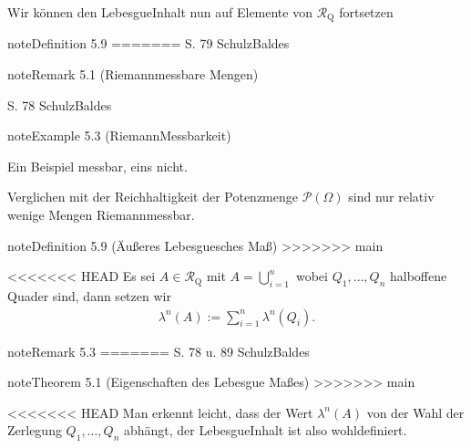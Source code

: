 \documentclass[letterpaper,10pt,english]{jupyterBook}
\begin{document}
\sphinxAtStartPar
Wir können den Lebesgue\sphinxhyphen{}Inhalt nun auf Elemente von \(\mathcal{R}_{\text{Q}}\) fortsetzen
\label{masstheorie/masstheorie:definition-15}
\begin{sphinxadmonition}{note}{Definition 5.9}
=======
S. 79 Schulz\sphinxhyphen{}Baldes
\end{sphinxadmonition}
\label{masstheorie/masstheorie:remark-10}
\begin{sphinxadmonition}{note}{Remark 5.1 (Riemann\sphinxhyphen{}messbare Mengen)}



\sphinxAtStartPar
S. 78 Schulz\sphinxhyphen{}Baldes
\end{sphinxadmonition}
\label{masstheorie/masstheorie:example-11}
\begin{sphinxadmonition}{note}{Example 5.3 (Riemann\sphinxhyphen{}Messbarkeit)}



\sphinxAtStartPar
Ein Beispiel messbar, eins nicht.
\end{sphinxadmonition}

\sphinxAtStartPar
Verglichen mit der Reichhaltigkeit der Potenzmenge \(\mathcal{P}(\Omega)\) sind nur relativ wenige Mengen Riemann\sphinxhyphen{}messbar.
\label{masstheorie/masstheorie:definition-12}
\begin{sphinxadmonition}{note}{Definition 5.9 (Äußeres Lebesguesches Maß)}
>>>>>>> main



\sphinxAtStartPar
<<<<<<< HEAD
Es sei \(A\in\mathcal{R}_{\text{Q}}\) mit \(A=\bigcup_{i=1}^n\) wobei \(Q_1,\ldots,Q_n\)  halboffene Quader sind, dann setzen wir
\begin{equation*}
\begin{split}\lambda^n(A):=\sum_{i=1}^{n} \lambda^n(Q_i).\end{split}
\end{equation*}\end{sphinxadmonition}
\label{masstheorie/masstheorie:remark-16}
\begin{sphinxadmonition}{note}{Remark 5.3}
=======
S. 78 u. 89 Schulz\sphinxhyphen{}Baldes
\end{sphinxadmonition}
\label{masstheorie/masstheorie:theorem-13}
\begin{sphinxadmonition}{note}{Theorem 5.1 (Eigenschaften des Lebesgue Maßes)}
>>>>>>> main



\sphinxAtStartPar
<<<<<<< HEAD
Man erkennt leicht, dass der Wert \(\lambda^n(A)\)  von der Wahl der Zerlegung \(Q_1,\ldots,Q_n\) abhängt, der Lebesgue\sphinxhyphen{}Inhalt ist also wohldefiniert.
\end{sphinxadmonition}
\end{document}
